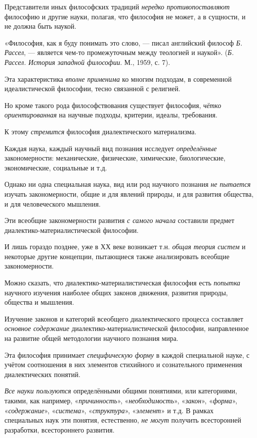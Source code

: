 \documentclass[a4paper,14pt,russian]{extreport}
\begin{document}
Представители иных философских традиций \emph{нередко противопоставляют} философию и другие науки, полагая, что философия не может, а в сущности, и не должна быть наукой.

«Философия, как я буду понимать это слово, --- писал английский философ \emph{Б. Рассел}, --- является чем-то промежуточным между теологией и наукой». (\emph{Б. Рассел. История западной философии}. М., 1959, с. 7).

Эта характеристика \emph{вполне применима} ко многим подходам, в современной идеалистической философии, тесно связанной с религией.

Но кроме такого рода философствования существует философия, \emph{чётко ориентированная} на научные подходы, критерии, идеалы, требования.

К этому \emph{стремится} философия диалектического материализма.

Каждая наука, каждый научный вид познания исследует \emph{определённые} закономерности: механические, физические, химические, биологические, экономические, социальные и т.д.

Однако ни одна специальная наука, вид или род научного познания \emph{не пытается} изучать закономерности, общие и для явлений природы, и для развития общества, и для человеческого мышления.

Эти всеобщие закономерности развития \emph{с самого начала} составили предмет диалектико-материалистической философии.

И лишь гораздо позднее, уже в ХХ веке возникает т.н. \emph{общая теория систем} и некоторые другие концепции, пытающиеся также анализировать всеобщие закономерности.

Можно сказать, что диалектико-материалистическая философия есть \emph{попытка} научного изучения наиболее общих законов движения, развития природы, общества и мышления.

Изучение законов и категорий всеобщего диалектического процесса составляет \emph{основное содержание} диалектико-материалистической философии, направленное на развитие общей методологии научного познания мира.

Эта философия принимает \emph{специфическую форму} в каждой специальной науке, с учётом соотношения в них элементов стихийного и сознательного применения диалектических понятий.

\emph{Все науки пользуются} определёнными общими понятиями, или категориями, такими, как например, «\emph{причинность}», «\emph{необходимость}», «\emph{закон}», «\emph{форма}», «\emph{содержание}», «\emph{система}», «\emph{структура}», «\emph{элемент}» и т.д. В рамках специальных наук эти понятия, естественно, \emph{не могут} получить всесторонней разработки, всестороннего развития.
\end{document}
